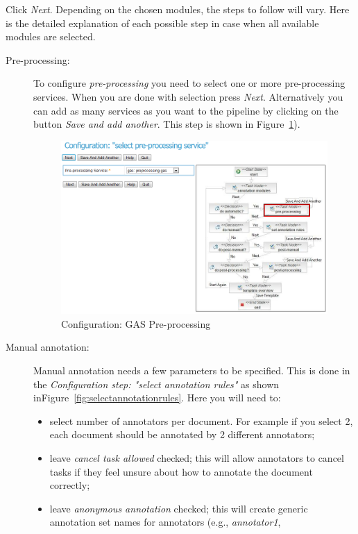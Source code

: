 Click \emph{Next}. Depending on the chosen modules, the steps to follow
will vary. Here is the detailed explanation of each possible step in case when
all available modules are selected.
\begin{description}
   \item [Pre-processing:] To configure \emph{pre-processing} you need to select
   one or more pre-processing services. When you are done with selection press 
   \emph{Next}. Alternatively you can add as many services as you want to 
   the pipeline by clicking on the button \emph{Save and add another}. This step
  is shown in Figure~\ref{fig:gaspreprocessing}). 
\begin{figure}[hb!]
\centering
\includegraphics[scale=0.4]{gaspreprocessing}
\caption{Configuration: GAS Pre-processing}
\label{fig:gaspreprocessing}
\end{figure}
    \item  [Manual annotation:] Manual annotation needs a few parameters to be
    specified. This is done in the \emph{Configuration step: "select annotation rules"} 
    as shown inFigure~\ref{fig:selectannotationrules}. Here you will need to:
   \begin{itemize}
       \item select number of annotators per document. For example if you select
       2, each document should be annotated by 2 different annotators;
       \item leave \emph{cancel task allowed} checked; this will allow
       annotators to cancel tasks if they feel unsure about how to annotate the
       document correctly;
       \item leave \emph{anonymous annotation} checked; this will create
       generic annotation set names for annotators (e.g., \emph{annotator1},

\end{itemize}
\end{description}
